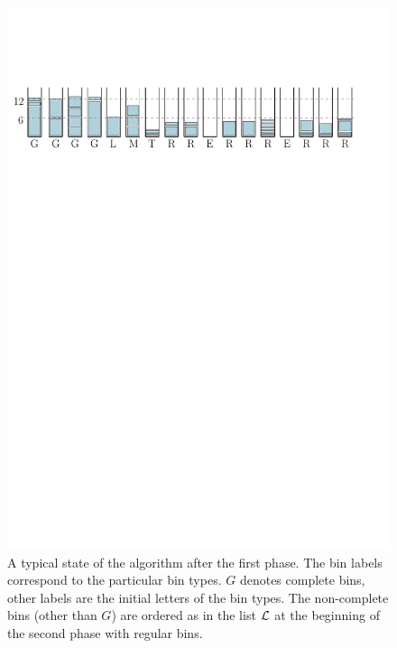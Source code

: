 \begin{figure}[th]
\begin{center}
\includegraphics[width=\textwidth]{img/first_phase.pdf}
\end{center}
\caption[A typical state of the algorithm after the first phase.]{A typical state of the algorithm after the first phase. The bin labels correspond to the particular bin types. $G$ denotes complete bins, other labels are the initial letters of the bin types. The non-complete bins (other than $G$) are ordered as in
  the list ${\mathcal L}$ at the beginning of the second phase with regular
  bins.}
\label{fig:1}
\end{figure}


